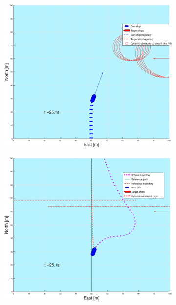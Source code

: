 \begin{figure}[ht!]
\begin{subfigure}[b]{0.499\textwidth}
    \end{subfigure}
    \hfill
    \\
    \begin{subfigure}[b]{0.49\textwidth}
        \centering
        \includegraphics[width=\textwidth]{Images/Figures/enkel_GW/_Simple_0fig1_time=25}
    \end{subfigure}
    \hfill
    \begin{subfigure}[b]{0.499\textwidth}
        \centering
        \includegraphics[width=\textwidth]{Images/Figures/enkel_GW/_Simple_0fig999_time=25}

\end{subfigure}
\end{figure}
